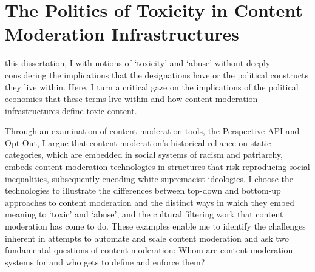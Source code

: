 \ifpdf
    \graphicspath{{Chapter4/Figs/Raster/}{Chapter4/Figs/PDF/}{Chapter4/Figs/}}
\else
    \graphicspath{{Chapter4/Figs/Vector/}{Chapter4/Figs/}}
\fi

\chapter[Politics of Toxicity in Content Moderation Infrastructures]{The Politics of Toxicity in Content Moderation Infrastructures\footnotemark{}}\label{chap:filter}

 this dissertation, I  with notions of `toxicity' and `abuse' without deeply considering the implications that the designations have or the political constructs they live within.
Here, I turn a critical gaze on the implications of the political economies that these terms live within and how content moderation infrastructures define toxic content.

Through an examination of  content moderation tools, the Perspective API and Opt Out, I argue that content moderation's historical reliance on static categories, which are embedded in social systems of racism and patriarchy, embeds content moderation technologies in structures that risk reproducing social inequalities, subsequently encoding white supremacist ideologies.
I choose the  technologies to illustrate the differences between top-down and bottom-up approaches to content moderation and the distinct ways in which they embed meaning to `toxic' and `abuse', and the cultural filtering work that content moderation has come to do.
These  examples enable me to identify the challenges inherent in attempts to automate and scale content moderation and ask two fundamental questions of content moderation: Whom are content moderation systems for and who gets to define and enforce them?

